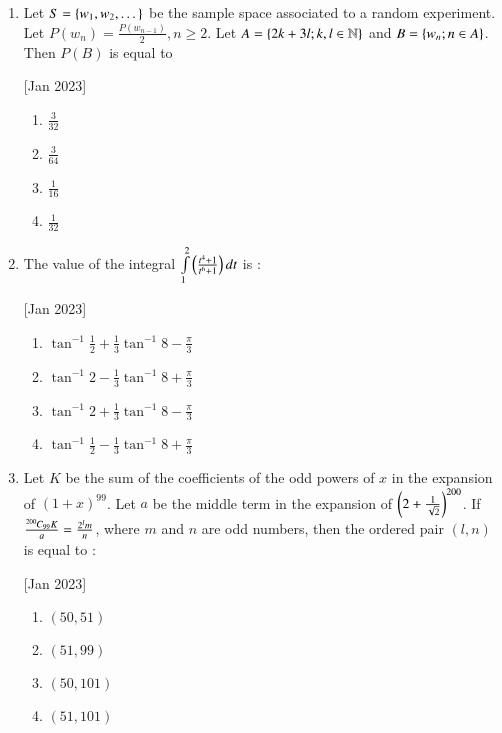\documentclass[journal,12pt,twocolumn]{IEEEtran}
\theoremstyle{remark}
\begin{document}
\begin{enumerate}
    \hfill[Jan 2023]
        \begin{enumerate}
            \item $34$
            \item $12$
            \item $36$
            \item $30$
        \end{enumerate}

    \item Let $S=\left\{w_1,w_2,\dots\right\}$ be the sample space associated to a random experiment. Let $P(w_n)=\frac{P(w_{n-1})}{2},n\geq2$. Let $A=\left\{2k+3l;k,l\in \mathbb{N}\right\}$ and $B=\left\{w_n;n\in A\right\}$. Then $P(B)$ is equal to
    
    \hfill[Jan 2023]
        \begin{enumerate}
            \item $\frac{3}{32}$
            \item $\frac{3}{64}$
            \item $\frac{1}{16}$
            \item $\frac{1}{32}$
        \end{enumerate}

    \item The value of the integral $\int\limits_1^2\left(\frac{t^4+1}{t^6+1}\right)dt$ is :
    
    \hfill[Jan 2023]
        \begin{enumerate}
            \item $\tan^{-1}\frac{1}{2}+\frac{1}{3}\tan^{-1}8-\frac{\pi}{3}$
            \item $\tan^{-1}2-\frac{1}{3}\tan^{-1}8+\frac{\pi}{3}$
            \item $\tan^{-1}2+\frac{1}{3}\tan^{-1}8-\frac{\pi}{3}$
            \item $\tan^{-1}\frac{1}{2}-\frac{1}{3}\tan^{-1}8+\frac{\pi}{3}$
        \end{enumerate}

    \item Let $K$ be the sum of the coefficients of the odd powers of $x$ in the expansion of $(1+x)^{99}$. Let $a$ be the middle term in the expansion of $\left(2+\frac{1}{\sqrt{2}}\right)^{200}$. If $\frac{{{}^{200}\mkern-1muC_{99}}K}{a}=\frac{2^lm}{n}$, where $m$ and $n$ are odd numbers, then the ordered pair $(l,n)$ is equal to :
    
    \hfill[Jan 2023]
        \begin{enumerate}
            \item $(50,51)$
            \item $(51,99)$
            \item $(50,101)$
            \item $(51,101)$
        \end{enumerate}


\end{enumerate}
\end{document}
